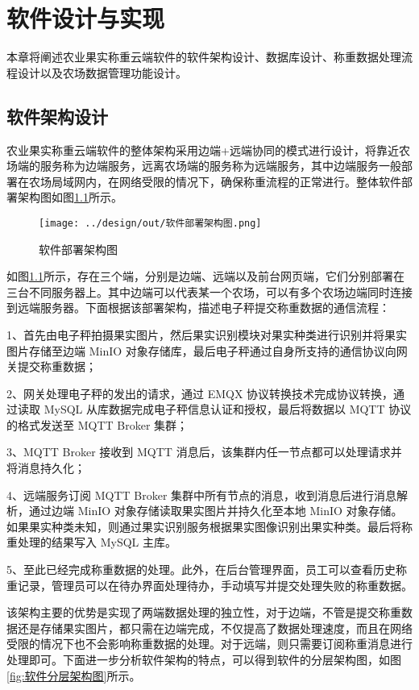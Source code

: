 \chapter{软件设计与实现}

本章将阐述农业果实称重云端软件的软件架构设计、数据库设计、称重数据处理流程设计以及农场数据管理功能设计。

\section{软件架构设计}\label{sec:architecture}

农业果实称重云端软件的整体架构采用边端+远端协同的模式进行设计，将靠近农场端的服务称为边端服务，远离农场端的服务称为远端服务，其中边端服务一般部署在农场局域网内，在网络受限的情况下，确保称重流程的正常进行。整体软件部署架构图如图\ref{fig:软件部署架构图}所示。

\begin{figure}[H]
    \centering
    \texttt{[image: ../design/out/软件部署架构图.png]}
    \caption{软件部署架构图}
    \label{fig:软件部署架构图}
\end{figure}

如图\ref{fig:软件部署架构图}所示，存在三个端，分别是边端、远端以及前台网页端，它们分别部署在三台不同服务器上。其中边端可以代表某一个农场，可以有多个农场边端同时连接到远端服务器。下面根据该部署架构，描述电子秤提交称重数据的通信流程：

1、首先由电子秤拍摄果实图片，然后果实识别模块对果实种类进行识别并将果实图片存储至边端 MinIO 对象存储库，最后电子秤通过自身所支持的通信协议向网关提交称重数据；

2、网关处理电子秤的发出的请求，通过 EMQX 协议转换技术完成协议转换，通过读取 MySQL 从库数据完成电子秤信息认证和授权，最后将数据以 MQTT 协议的格式发送至 MQTT Broker 集群；

3、MQTT Broker 接收到 MQTT 消息后，该集群内任一节点都可以处理请求并将消息持久化；

4、远端服务订阅 MQTT Broker 集群中所有节点的消息，收到消息后进行消息解析，通过边端 MinIO 对象存储读取果实图片并持久化至本地 MinIO 对象存储。如果果实种类未知，则通过果实识别服务根据果实图像识别出果实种类。最后将称重处理的结果写入 MySQL 主库。

5、至此已经完成称重数据的处理。此外，在后台管理界面，员工可以查看历史称重记录，管理员可以在待办界面处理待办，手动填写并提交处理失败的称重数据。

该架构主要的优势是实现了两端数据处理的独立性，对于边端，不管是提交称重数据还是存储果实图片，都只需在边端完成，不仅提高了数据处理速度，而且在网络受限的情况下也不会影响称重数据的处理。对于远端，则只需要订阅称重消息进行处理即可。下面进一步分析软件架构的特点，可以得到软件的分层架构图，如图\ref{fig:软件分层架构图}所示。

